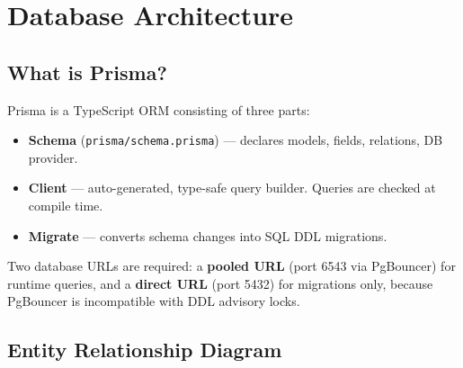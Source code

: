 \documentclass[12pt,a4paper]{report}
\begin{document}
\chapter{Database Architecture}

\section{What is Prisma?}

Prisma is a TypeScript ORM consisting of three parts:
\begin{itemize}[leftmargin=2em]
  \item \textbf{Schema} (\texttt{prisma/schema.prisma}) --- declares models, fields, relations, DB provider.
  \item \textbf{Client} --- auto-generated, type-safe query builder. Queries are checked at compile time.
  \item \textbf{Migrate} --- converts schema changes into SQL DDL migrations.
\end{itemize}

Two database URLs are required: a \textbf{pooled URL} (port 6543 via PgBouncer) for runtime queries, and a \textbf{direct URL} (port 5432) for migrations only, because PgBouncer is incompatible with DDL advisory locks.

\section{Entity Relationship Diagram}
\end{document}
